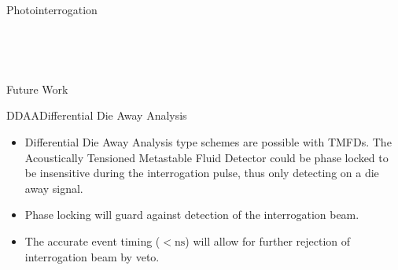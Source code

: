 \begin{col}{6}{12}
\begin{cell}{6}{8}{Photointerrogation}{}
\begin{col}{4}{8}
\begin{cell}{4}{3}{}{}
      \end{cell} \\
      \vspace*{\fill}
      \begin{cell}{4}{5}{}{}
      \end{cell}
    \end{col}%
  \end{cell}
  \vspace*{\fill} \\
  \begin{cell}{6}{4}{Future Work}{}
    \begin{cell}{3}{4}{DDAA}{Differential Die Away Analysis}
      \vspace*{\fill}
      \begin{itemize}
        \item Differential Die Away Analysis type schemes are possible with TMFDs. The Acoustically Tensioned Metastable Fluid Detector could be phase locked to be insensitive during the interrogation pulse, thus only detecting on a die away signal.
        \item Phase locking will guard against detection of the interrogation beam.
        \item The accurate event timing ($<\mathrm{ns}$) will allow for further rejection of interrogation beam by veto.
      \end{itemize}
      \vspace*{\fill}
    \end{cell}%
    \hspace*{\fill}
    \begin{cell}{3}{4}{}{}
    \end{cell}
  \end{cell}%
\end{col}
